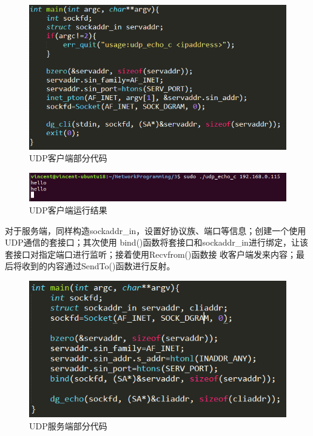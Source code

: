 \documentclass[UTF8]{ctexart}
\begin{document}
\begin{figure}[H]
\includegraphics[width=\textwidth]{pic/udp_client_main.PNG}
\caption{UDP客户端部分代码}
\end{figure}

\begin{figure}[H]
\includegraphics[width=\textwidth]{pic/udp_client.PNG}
\caption{UDP客户端运行结果}
\end{figure}

对于服务端，同样构造sockaddr\_in，设置好协议族、端口等信息；创建一个使用UDP通信的套接口；其次使用
bind()函数将套接口和sockaddr\_in进行绑定，让该套接口对指定端口进行监听；接着使用Recvfrom()函数接
收客户端发来内容；最后将收到的内容通过SendTo()函数进行反射。

\begin{figure}[H]
\includegraphics[width=\textwidth]{pic/udp_server_main.PNG}
\caption{UDP服务端部分代码}
\end{figure}
\end{document}

